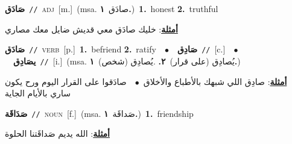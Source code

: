 \documentclass[10pt,a4paper,twoside]{article} %
\begin{document}
\begin{multicols}{2}
{\setlength\topsep{0pt}\textbf{\foreignlanguage{arabic}{صَادَق}}\ {\color{gray}\texttt{//}\color{black}}\ \textsc{adj}\ [m.]\ \color{gray}(msa. \foreignlanguage{arabic}{صادَق}~\foreignlanguage{arabic}{\textbf{١.}})\color{black}\ \textbf{1.}~honest  \textbf{2.}~truthful\  \begin{flushright}\color{gray}\foreignlanguage{arabic}{\textbf{\underline{\foreignlanguage{arabic}{أمثلة}}}: خليك صادَق معي قديش ضايل معك مصاري}\end{flushright}\color{black}} \vspace{2mm}

{\setlength\topsep{0pt}\textbf{\foreignlanguage{arabic}{صَادَق}}\ {\color{gray}\texttt{//}\color{black}}\ \textsc{verb}\ [p.]\ \textbf{1.}~befriend  \textbf{2.}~ratify\ \ $\bullet$\ \ \setlength\topsep{0pt}\textbf{\foreignlanguage{arabic}{صَادِق}}\ {\color{gray}\texttt{//}\color{black}}\ [c.]\ \ $\bullet$\ \ \setlength\topsep{0pt}\textbf{\foreignlanguage{arabic}{يصَادِق}}\ {\color{gray}\texttt{//}\color{black}}\ [i.]\ \color{gray}(msa. \foreignlanguage{arabic}{يُصادِق (على قرار)}~\foreignlanguage{arabic}{\textbf{٢.}}  .\foreignlanguage{arabic}{يُصادِق (شخص)}~\foreignlanguage{arabic}{\textbf{١.}})\color{black}\  \begin{flushright}\color{gray}\foreignlanguage{arabic}{\textbf{\underline{\foreignlanguage{arabic}{أمثلة}}}: صادِق اللي شبهك بالأطباع والأخلاق\ $\bullet$\ \  صادَقوا على القرار اليوم ورح يكون ساري بالأيام الجاية}\end{flushright}\color{black}} \vspace{2mm}

{\setlength\topsep{0pt}\textbf{\foreignlanguage{arabic}{صَدَاقَة}}\ {\color{gray}\texttt{//}\color{black}}\ \textsc{noun}\ [f.]\ \color{gray}(msa. \foreignlanguage{arabic}{صَداقَة}~\foreignlanguage{arabic}{\textbf{١.}})\color{black}\ \textbf{1.}~friendship\  \begin{flushright}\color{gray}\foreignlanguage{arabic}{\textbf{\underline{\foreignlanguage{arabic}{أمثلة}}}: الله يديم صَداقَتنا الحلوة}\end{flushright}\color{black}} \vspace{2mm}


\end{multicols}
\end{document}
